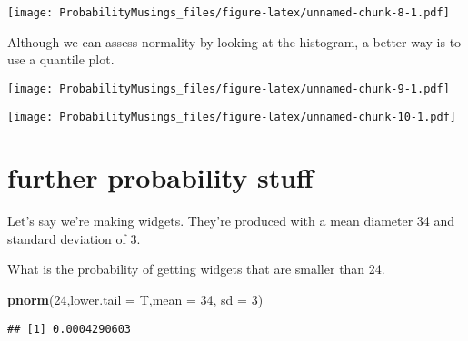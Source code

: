 \documentclass[]{article}
\newenvironment{Shaded}{\begin{snugshade}}{\end{snugshade}}
\newcommand{\KeywordTok}[1]{\textcolor[rgb]{0.13,0.29,0.53}{\textbf{#1}}}
\newcommand{\DataTypeTok}[1]{\textcolor[rgb]{0.13,0.29,0.53}{#1}}
\newcommand{\DecValTok}[1]{\textcolor[rgb]{0.00,0.00,0.81}{#1}}
\newcommand{\StringTok}[1]{\textcolor[rgb]{0.31,0.60,0.02}{#1}}
\newcommand{\OperatorTok}[1]{\textcolor[rgb]{0.81,0.36,0.00}{\textbf{#1}}}
\newcommand{\NormalTok}[1]{#1}
\begin{document}
\texttt{[image: ProbabilityMusings\_files/figure-latex/unnamed-chunk-8-1.pdf]}

Although we can assess normality by looking at the histogram, a better
way is to use a quantile plot.

\begin{Shaded}
\end{Shaded}

\texttt{[image: ProbabilityMusings\_files/figure-latex/unnamed-chunk-9-1.pdf]}

\begin{Shaded}
\end{Shaded}

\texttt{[image: ProbabilityMusings\_files/figure-latex/unnamed-chunk-10-1.pdf]}

\section{further probability stuff}\label{further-probability-stuff}

Let's say we're making widgets. They're produced with a mean diameter 34
and standard deviation of 3.

What is the probability of getting widgets that are smaller than 24.

\begin{Shaded}
\begin{Highlighting}[]
\KeywordTok{pnorm}\NormalTok{(}\DecValTok{24}\NormalTok{,}\DataTypeTok{lower.tail =}\NormalTok{ T,}\DataTypeTok{mean =} \DecValTok{34}\NormalTok{, }\DataTypeTok{sd =} \DecValTok{3}\NormalTok{)}
\end{Highlighting}
\end{Shaded}

\begin{verbatim}
## [1] 0.0004290603
\end{verbatim}
\end{document}
